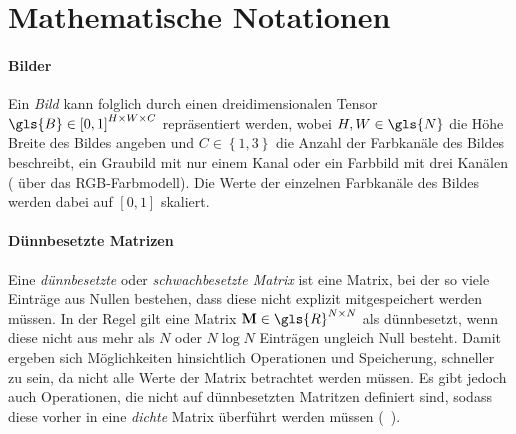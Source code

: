 \section{Mathematische Notationen}
\label{mathematische_notationen}



\paragraph{Bilder}

Ein \emph{Bild} kann folglich durch einen dreidimensionalen Tensor $\gls{B} \in {\left[0, 1\right]}^{H \times W \times C}$ repräsentiert werden, wobei $H, W \in \gls{N}$ die Höhe \bzw{} Breite des Bildes angeben und $C \in \left\{1, 3\right\}$ die Anzahl der Farbkanäle des Bildes beschreibt, \dhe{} ein Graubild mit nur einem Kanal oder ein Farbbild mit drei Kanälen (\zB{} über das RGB-Farbmodell).
Die Werte der einzelnen Farbkanäle des Bildes werden dabei auf $\left[0, 1\right]$ skaliert.

\paragraph{Dünnbesetzte Matrizen}

Eine \emph{dünnbesetzte} oder \emph{schwachbesetzte Matrix} ist eine Matrix, bei der so viele Einträge aus Nullen bestehen, dass diese nicht explizit mitgespeichert werden müssen.
In der Regel gilt eine Matrix $\ma{M}\in \gls{R}^{N \times N}$ als dünnbesetzt, wenn diese nicht aus mehr als $N$ oder $N \log N$ Einträgen ungleich Null besteht.
Damit ergeben sich Möglichkeiten hinsichtlich Operationen und Speicherung, schneller zu sein, da nicht alle Werte der Matrix betrachtet werden müssen.
Es gibt jedoch auch Operationen, die nicht auf dünnbesetzten Matritzen definiert sind, sodass diese vorher in eine \emph{dichte} Matrix überführt werden müssen (\vgl{}~\cite{Saad}).

